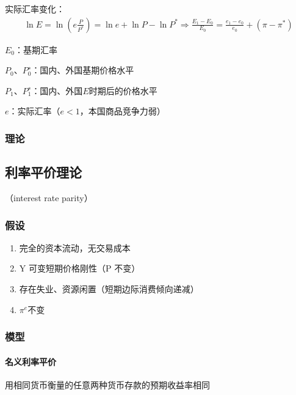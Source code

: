 \documentclass[12pt]{book}
\begin{document}
实际汇率变化：
\begin{gather*}
    \ln{E}=\ln{\left(e\frac{P}{P^\ast}\right)}=\ln{e}+\ln{P}-\ln{P^\ast}\Rightarrow\frac{E_1-E_0}{E_0}=\frac{e_1-e_0}{e_0}+\left(\pi-\pi^\ast\right)
\end{gather*}
\par $E_0$：基期汇率  
\par $P_0$、$P_0^∗$：国内、外国基期价格水平  
\par $P_1$、$P_1^∗$：国内、外国$E$时期后的价格水平   
\par $e$：实际汇率（$e < 1$，本国商品竞争力弱）


\subsubsection{理论}



\subsection{利率平价理论}

（interest rate parity）  




\subsubsection{假设}

\begin{enumerate}[1.]
    \item 完全的资本流动，无交易成本  
    \item Y 可变短期价格刚性（P 不变）  
    \item 存在失业、资源闲置（短期边际消费倾向递减）  
    \item $\pi^e$不变 
\end{enumerate}
 


\subsubsection{模型}

\paragraph{名义利率平价}

用相同货币衡量的任意两种货币存款的预期收益率相同
\end{document}
